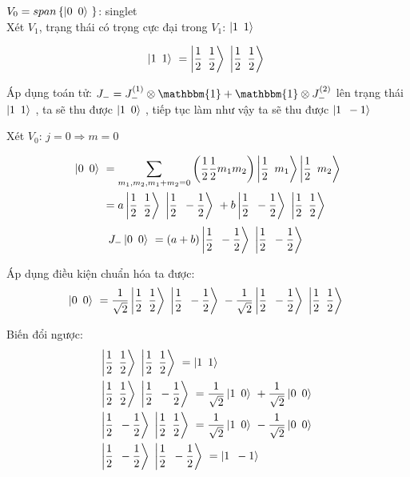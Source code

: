 \documentclass{report}
\begin{document}
\hspace*{0.5cm} \( V_{0} = span\left\lbrace  \left| 0 \enskip 0 \right\rangle\ \right\rbrace \): singlet \\

Xét \(V_{1}\), trạng thái có trọng cực đại trong \(V_{1}\): \( \left| 1 \enskip 1 \right\rangle\ \)

\[ \left| 1 \enskip 1 \right\rangle\ = \left| \frac{1}{2} \enskip \frac{1}{2} \right\rangle\ \left| \frac{1}{2} \enskip \frac{1}{2} \right\rangle\ \]

Áp dụng toán tử: \( J_{-} = J_{-}^{(1)} \otimes \mathbbm{1} +  \mathbbm{1} \otimes J_{-}^{(2)} \) lên trạng thái \( \left| 1 \enskip 1 \right\rangle\ \), ta sẽ thu được \( \left| 1 \enskip 0 \right\rangle\ \), tiếp tục làm như vậy ta sẽ thu được \( \left| 1 \enskip -1 \right\rangle\ \)

Xét \(V_{0}\): \(j = 0 \Rightarrow m = 0\)

	\begin{align*}
		\left| 0 \enskip 0 \right\rangle\ & = \sum_{m_{1},m_{2}, m_{1}+m_{2}=0} \left( \frac{1}{2} \frac{1}{2} m_{1} m_{2} \right) \left| \frac{1}{2} \enskip m_{1} \right\rangle \left| \frac{1}{2} \enskip m_{2} \right\rangle \\
		& = a \left| \frac{1}{2} \enskip \frac{1}{2} \right\rangle\ \left| \frac{1}{2} \enskip - \frac{1}{2} \right\rangle\ + b \left| \frac{1}{2} \enskip - \frac{1}{2} \right\rangle\ \left| \frac{1}{2} \enskip \frac{1}{2} \right\rangle\
	\end{align*}
	\[ J_{-} \left| 0 \enskip 0 \right\rangle\ = (a+b) \left| \frac{1}{2} \enskip - \frac{1}{2} \right\rangle\ \left| \frac{1}{2} \enskip - \frac{1}{2} \right\rangle\ \]
	
	Áp dụng điều kiện chuẩn hóa ta được:
	\[ \left| 0 \enskip 0 \right\rangle\ = \frac{1}{\sqrt{2}} \left| \frac{1}{2} \enskip \frac{1}{2} \right\rangle\ \left| \frac{1}{2} \enskip - \frac{1}{2} \right\rangle\ - \frac{1}{\sqrt{2}} \left| \frac{1}{2} \enskip - \frac{1}{2} \right\rangle\ \left| \frac{1}{2} \enskip \frac{1}{2} \right\rangle\ \]
	
	Biến đổi ngược:
	\begin{align*}
		& \left| \frac{1}{2} \enskip \frac{1}{2} \right\rangle\ \left| \frac{1}{2} \enskip \frac{1}{2} \right\rangle\ = \left| 1 \enskip 1 \right\rangle\ \\
		& \left| \frac{1}{2} \enskip \frac{1}{2} \right\rangle\ \left| \frac{1}{2} \enskip - \frac{1}{2} \right\rangle\ = \frac{1}{\sqrt{2}} \left| 1 \enskip 0 \right\rangle\ + \frac{1}{\sqrt{2}} \left| 0 \enskip 0 \right\rangle\ \\
		& \left| \frac{1}{2} \enskip - \frac{1}{2} \right\rangle\ \left| \frac{1}{2} \enskip \frac{1}{2} \right\rangle\ = \frac{1}{\sqrt{2}} \left| 1 \enskip 0 \right\rangle\ - \frac{1}{\sqrt{2}} \left| 0 \enskip 0 \right\rangle\ \\
		& \left| \frac{1}{2} \enskip - \frac{1}{2} \right\rangle\ \left| \frac{1}{2} \enskip - \frac{1}{2} \right\rangle\ = \left| 1 \enskip - 1 \right\rangle\
	\end{align*}
\end{document}
